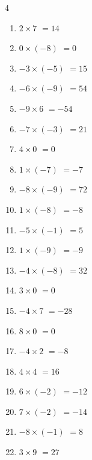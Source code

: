 \begin{multicols}{4}
\begin{enumerate}
  \item $2\times 7$
        $=14$

  \item $0\times (-8)$
        $=0$

\columnbreak %

  \item $-3\times (-5)$
        $=15$

  \item $-6\times (-9)$
        $=54$

  \item $-9\times 6$
        $=-54$

  \item $-7\times (-3)$
        $=21$

  \item $4\times 0$
        $=0$

  \item $1\times (-7)$
        $=-7$

  \item $-8\times (-9)$
        $=72$

  \item $1\times (-8)$
        $=-8$

  \item $-5\times (-1)$
        $=5$

  \item $1\times (-9)$
        $=-9$

  \item $-4\times (-8)$
        $=32$

  \item $3\times 0$
        $=0$

  \item $-4\times 7$
        $=-28$

  \item $8\times 0$
        $=0$

  \item $-4\times 2$
        $=-8$

  \item $4\times 4$
        $=16$

  \item $6\times (-2)$
        $=-12$

  \item $7\times (-2)$
        $=-14$

  \item $-8\times (-1)$
        $=8$

  \item $3\times 9$
        $=27$


\end{enumerate}
\end{multicols}
